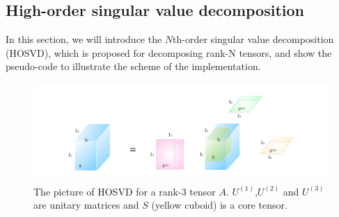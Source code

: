 \subsection{High-order singular value decomposition}
\label{hosvd}
In this section, we will introduce the $N$th-order singular value decomposition (HOSVD), which is proposed for decomposing rank-N tensors, and show the pseudo-code to illustrate the scheme of the implementation.
\begin{figure}[b]
	\centering
	\includegraphics[width=1.00\textwidth]{figures/fig4311.png}
	\caption[The picture of HOSVD for a rank-3 tensor.]{The picture of HOSVD for a rank-3 tensor $A$. $U^{(1)}$,$U^{(2)}$ and $U^{(3)}$ are unitary matrices and $S$ (yellow cuboid) is a core tensor.}
	\label{fig4311}
\end{figure}

